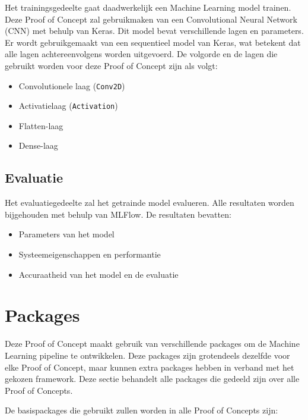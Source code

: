 Het trainingsgedeelte gaat daadwerkelijk een Machine Learning model trainen. Deze Proof of Concept zal gebruikmaken van een Convolutional Neural Network (CNN) met behulp van Keras. Dit model bevat verschillende lagen en parameters. Er wordt gebruikgemaakt van een sequentieel model van Keras, wat betekent dat alle lagen achtereenvolgens worden uitgevoerd. De volgorde en de lagen die gebruikt worden voor deze Proof of Concept zijn als volgt:

\begin{itemize}
    \item Convolutionele laag (\texttt{Conv2D})
    \item Activatielaag (\texttt{Activation})
    \item Flatten-laag
    \item Dense-laag
\end{itemize}

\subsection{Evaluatie}

Het evaluatiegedeelte zal het getrainde model evalueren. Alle resultaten worden bijgehouden met behulp van MLFlow. De resultaten bevatten:

\begin{itemize}
    \item Parameters van het model
    \item Systeemeigenschappen en performantie
    \item Accuraatheid van het model en de evaluatie
\end{itemize}

\section{Packages}

Deze Proof of Concept maakt gebruik van verschillende packages om de Machine Learning pipeline te ontwikkelen. Deze packages zijn grotendeels dezelfde voor elke Proof of Concept, maar kunnen extra packages hebben in verband met het gekozen framework. Deze sectie behandelt alle packages die gedeeld zijn over alle Proof of Concepts.

De basispackages die gebruikt zullen worden in alle Proof of Concepts zijn:

